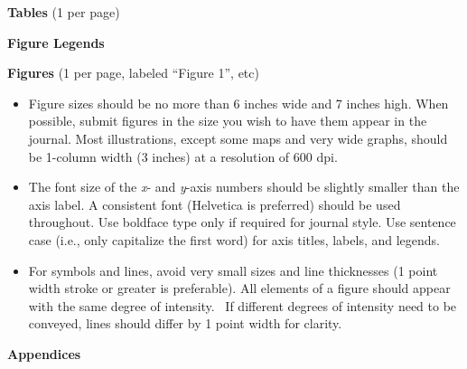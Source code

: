 \documentclass[11pt]{article}
\begin{document}
\textbf{Tables} (1 per page)

\textbf{Figure Legends}

\textbf{Figures} (1 per page, labeled ``Figure 1'', etc)

\begin{itemize}
\item
  Figure sizes should be no more than 6 inches wide and 7 inches high.
  When possible, submit figures in the size you wish to have them appear
  in the journal. Most illustrations, except some maps and very wide
  graphs, should be 1-column width (3 inches) at a resolution of 600
  dpi.
\item
  The font size of the \emph{x}- and \emph{y}-axis numbers should be
  slightly smaller than the axis label. A consistent font (Helvetica is
  preferred) should be used throughout. Use boldface type only if
  required for journal style. Use sentence case (i.e., only capitalize
  the first word) for axis titles, labels, and legends.
\item
  For symbols and lines, avoid very small sizes and line thicknesses (1
  point width stroke or greater is preferable). All elements of a figure
  should appear with the same degree of intensity.~ If different degrees
  of intensity need to be conveyed, lines should differ by 1 point width
  for clarity.
\end{itemize}

\textbf{Appendices}



\end{document}

